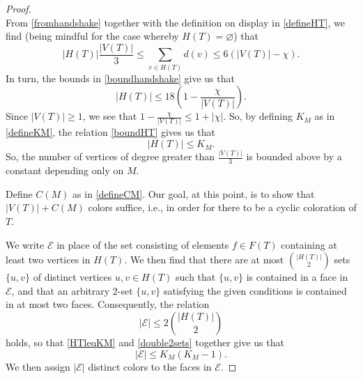 \documentclass[12pt]{article}
\begin{document}
\begin{proof}
\begin{equation}
\end{equation}
 From \eqref{fromhandshake} together with the definition on display in \eqref{defineHT}, we find (being mindful for the case whereby
 $H(T) = \varnothing$) that 
\begin{equation}\label{boundhandshake} 
 \left| H(T) \right| \frac{ \left| V(T) \right| }{3} 
 \leq \sum_{v \in H(T)} d(v) \leq 6 \left( \left| V(T) \right| - \chi \right). 
\end{equation}
 In turn, the bounds in \eqref{boundhandshake} 
 give us that 
\begin{equation}\label{boundHT} 
 \left| H(T) \right| \leq 18 \left( 1 - \frac{\chi}{ \left| V(T) \right| } \right). 
\end{equation}
 Since $\left| V(T) \right| \geq 1$, we see that 
 $1 - \frac{\chi}{ \left| V(T) \right| } \leq 1 + \left| \chi \right|$. 
 So, by defining $K_{M}$ as in \eqref{defineKM}, 
 the relation \eqref{boundHT} gives us that 
\begin{equation}\label{HTleqKM} 
 \left| H(T) \right| \leq K_{M}.
\end{equation} 
 So, the number of vertices of degree greater than $\frac{\left| V(T) \right|}{3}$
 is bounded above by a constant depending only on $M$. 

 Define $C(M)$ as in \eqref{defineCM}. 
 Our goal, at this point, is to show that $\left| V(T) \right| + C(M)$
 colors suffice, i.e., in order for there to 
 be a cyclic coloration of $T$. 

 We write $\mathcal{E}$ in place of the set consisting of elements $f \in F(T)$ containing at least two vertices in $H(T)$. We then find that 
 there are at most $\binom{ \left| H(T) \right| }{2}$ 
 sets $\{ u, v \}$ of distinct vertices $u, v \in H(T)$
 such that $\{ u, v \}$ is contained in a face in $\mathcal{E}$, 
 and that an arbitrary 2-set $\{ u, v \}$ satisfying the given conditions
 is contained in at most two faces. Consequently, the relation 
\begin{equation}\label{double2sets} 
 \left| \mathcal{E} \right| \leq 2 \binom{ \left| H(T) \right| }{2} 
\end{equation}
 holds, so that \eqref{HTleqKM} and \eqref{double2sets} together give us that 
\begin{equation}\label{boundexceptional} 
 \left| \mathcal{E} \right| \leq K_{M} \left( K_{M} - 1 \right). 
\end{equation}
 We then assign $\left| \mathcal{E} \right|$
 distinct colors to the faces in $\mathcal{E}$. 


\end{proof}
\end{document}
